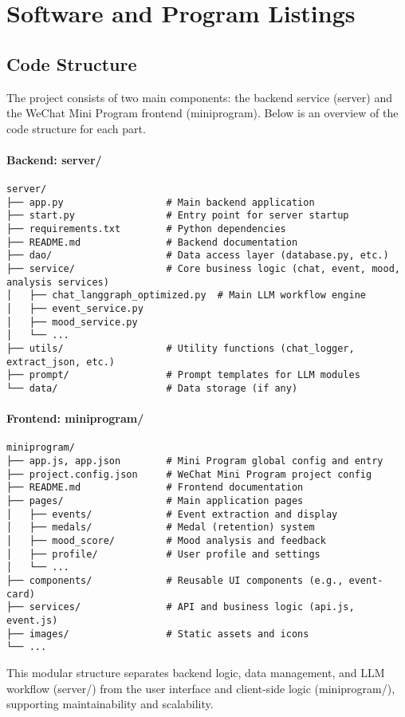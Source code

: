 \section{Software and Program Listings}
\label{sec:software}

\subsection{Code Structure}

The project consists of two main components: the backend service (server) and the WeChat Mini Program frontend (miniprogram). Below is an overview of the code structure for each part.

\paragraph{Backend: server/}
\begin{verbatim}
server/
├── app.py                  # Main backend application
├── start.py                # Entry point for server startup
├── requirements.txt        # Python dependencies
├── README.md               # Backend documentation
├── dao/                    # Data access layer (database.py, etc.)
├── service/                # Core business logic (chat, event, mood, analysis services)
│   ├── chat_langgraph_optimized.py  # Main LLM workflow engine
│   ├── event_service.py
│   ├── mood_service.py
│   └── ...
├── utils/                  # Utility functions (chat_logger, extract_json, etc.)
├── prompt/                 # Prompt templates for LLM modules
└── data/                   # Data storage (if any)
\end{verbatim}

\paragraph{Frontend: miniprogram/}
\begin{verbatim}
miniprogram/
├── app.js, app.json        # Mini Program global config and entry
├── project.config.json     # WeChat Mini Program project config
├── README.md               # Frontend documentation
├── pages/                  # Main application pages
│   ├── events/             # Event extraction and display
│   ├── medals/             # Medal (retention) system
│   ├── mood_score/         # Mood analysis and feedback
│   ├── profile/            # User profile and settings
│   └── ...
├── components/             # Reusable UI components (e.g., event-card)
├── services/               # API and business logic (api.js, event.js)
├── images/                 # Static assets and icons
└── ...
\end{verbatim}

This modular structure separates backend logic, data management, and LLM workflow (server/) from the user interface and client-side logic (miniprogram/), supporting maintainability and scalability.

